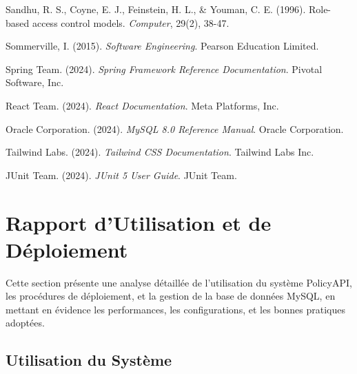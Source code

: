 \documentclass[12pt,a4paper]{article}
\begin{document}
\begin{thebibliography}{20}
        Sandhu, R. S., Coyne, E. J., Feinstein, H. L., \& Youman, C. E. (1996). Role-based access control models. \textit{Computer}, 29(2), 38-47.

        Sommerville, I. (2015). \textit{Software Engineering}. Pearson Education Limited.

        Spring Team. (2024). \textit{Spring Framework Reference Documentation}. Pivotal Software, Inc.

        React Team. (2024). \textit{React Documentation}. Meta Platforms, Inc.

        Oracle Corporation. (2024). \textit{MySQL 8.0 Reference Manual}. Oracle Corporation.

        Tailwind Labs. (2024). \textit{Tailwind CSS Documentation}. Tailwind Labs Inc.

        JUnit Team. (2024). \textit{JUnit 5 User Guide}. JUnit Team.

    \end{thebibliography}

    \newpage

    \section{Rapport d'Utilisation et de Déploiement}

    Cette section présente une analyse détaillée de l'utilisation du système PolicyAPI, les procédures de déploiement, et la gestion de la base de données MySQL, en mettant en évidence les performances, les configurations, et les bonnes pratiques adoptées.

    \subsection{Utilisation du Système}
\end{document}
